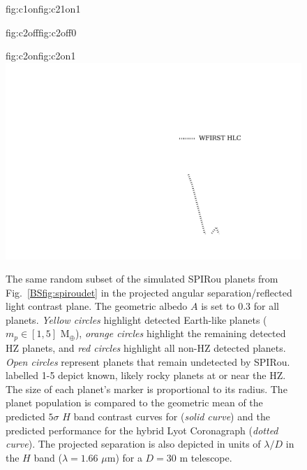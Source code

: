 \begin{figure}
\begin{ocg}{fig:c1on}{fig:c21on}{1}
  \end{ocg}
  \hspace{-0.8\hsize}%
  \begin{ocg}{fig:c2off}{fig:c2off}{0}%
  \end{ocg}%
  \begin{ocg}{fig:c2on}{fig:c2on}{1}%
   \includegraphics[width=0.8\hsize]{figures/SPIRoudet_contrast_curve2.png}%
  \end{ocg}
  \hspace{-0.8\hsize}%
  \caption[One realization of targetted and detected planets in the SLS-PS versus angular separation and reflected light contrast.]
      {\small The same random subset of the simulated SPIRou planets from Fig.~\ref{BSfig:spiroudet}
    in the projected angular separation/reflected light contrast plane. The geometric albedo $A$ is set
    to 0.3 for all planets. 
    \emph{Yellow circles} highlight detected Earth-like planets ($m_p \in [1,5]$ M$_{\oplus}$), \emph{orange circles}
    highlight the remaining detected HZ planets, and \emph{red circles} highlight all non-HZ detected planets. 
    \emph{Open circles} represent planets that remain undetected by SPIRou.
     labelled
    1-5 depict known, likely rocky planets at or near the HZ. 
    The size of each planet's marker is proportional to its radius.
    The planet population is compared to the geometric mean of the predicted $5\sigma$ $H$ band contrast curves for
     (\emph{solid curve}) and
    the predicted performance for the 
     hybrid Lyot Coronagraph (\emph{dotted curve}). The
    projected separation is also depicted in units of $\lambda /D$ in the $H$ band ($\lambda = 1.66$ $\mu$m) for a
    $D=30$ m telescope.}
  \label{BSfig:spirouimaging}
\end{figure}


